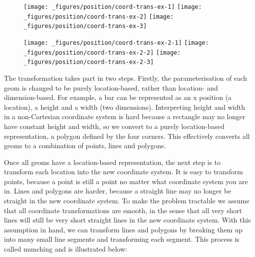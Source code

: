 \begin{figure}[H]
  \texttt{[image: \_figures/position/coord-trans-ex-1]}%
  \texttt{[image: \_figures/position/coord-trans-ex-2]}%
  \texttt{[image: \_figures/position/coord-trans-ex-3]}
\end{figure}

\begin{Shaded}
\begin{Highlighting}[]
\StringTok{ }\NormalTok{()}
\StringTok{ }\NormalTok{(} \NormalTok{)}
\StringTok{ }\NormalTok{()}
\end{Highlighting}
\end{Shaded}

\begin{figure}[H]
  \texttt{[image: \_figures/position/coord-trans-ex-2-1]}%
  \texttt{[image: \_figures/position/coord-trans-ex-2-2]}%
  \texttt{[image: \_figures/position/coord-trans-ex-2-3]}
\end{figure}

The transformation takes part in two steps. Firstly, the
parameterisation of each geom is changed to be purely location-based,
rather than location- and dimension-based. For example, a bar can be
represented as an x position (a location), a height and a width (two
dimensions). Interpreting height and width in a non-Cartesian coordinate
system is hard because a rectangle may no longer have constant height
and width, so we convert to a purely location-based representation, a
polygon defined by the four corners. This effectively converts all geoms
to a combination of points, lines and polygons.
 

Once all geoms have a location-based representation, the next step is to
transform each location into the new coordinate system. It is easy to
transform points, because a point is still a point no matter what
coordinate system you are in. Lines and polygons are harder, because a
straight line may no longer be straight in the new coordinate system. To
make the problem tractable we assume that all coordinate transformations
are smooth, in the sense that all very short lines will still be very
short straight lines in the new coordinate system. With this assumption
in hand, we can transform lines and polygons by breaking them up into
many small line segments and transforming each segment. This process is
called munching and is illustrated below: 

